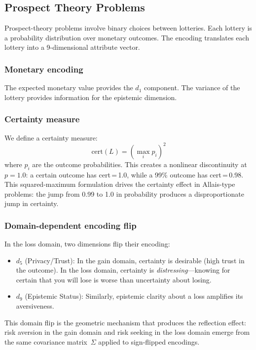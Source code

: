 \documentclass[journal]{IEEEtran}
\begin{document}
\subsection{Prospect Theory Problems}

Prospect-theory problems involve binary choices between lotteries.
Each lottery is a probability distribution over monetary outcomes.
The encoding translates each lottery into a 9-dimensional attribute vector.

\subsubsection{Monetary encoding}
The expected monetary value provides the $d_1$ component.
The variance of the lottery provides information for the epistemic dimension.

\subsubsection{Certainty measure}
We define a certainty measure:
\begin{equation}
    \text{cert}(L) = \left(\max_i p_i\right)^2
    \label{eq:certainty}
\end{equation}
where $p_i$ are the outcome probabilities.
This creates a nonlinear discontinuity at $p = 1.0$: a certain outcome has cert\,=\,1.0, while a 99\% outcome has cert\,=\,0.98.
This squared-maximum formulation drives the certainty effect in Allais-type problems: the jump from 0.99 to 1.0 in probability produces a disproportionate jump in certainty.

\subsubsection{Domain-dependent encoding flip}
In the loss domain, two dimensions flip their encoding:
\begin{itemize}
    \item $d_5$ (Privacy/Trust): In the gain domain, certainty is desirable (high trust in the outcome). In the loss domain, certainty is \emph{distressing}---knowing for certain that you will lose is worse than uncertainty about losing.
    \item $d_9$ (Epistemic Status): Similarly, epistemic clarity about a loss amplifies its aversiveness.
\end{itemize}
This domain flip is the geometric mechanism that produces the reflection effect: risk aversion in the gain domain and risk seeking in the loss domain emerge from the same covariance matrix~$\Sigma$ applied to sign-flipped encodings.
\end{document}

